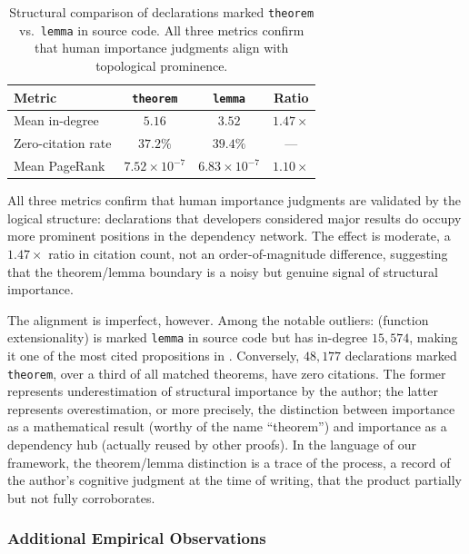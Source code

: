 \begin{table}[ht]
\centering
\begin{tabular}{lccc}
\toprule
Metric & \texttt{theorem} & \texttt{lemma} & Ratio \\
\midrule
Mean in-degree        & $5.16$ & $3.52$ & $1.47\times$ \\
Zero-citation rate    & $37.2\%$ & $39.4\%$ & --- \\
Mean PageRank         & $7.52 \times 10^{-7}$ & $6.83 \times 10^{-7}$ & $1.10\times$ \\
\bottomrule
\end{tabular}
\caption{Structural comparison of declarations marked \texttt{theorem} vs.\ \texttt{lemma} in source code. All three metrics confirm that human importance judgments align with topological prominence.}
\label{tab:thm-vs-lemma}
\end{table}

All three metrics confirm that human importance judgments are validated by the logical structure: declarations that developers considered major results do occupy more prominent positions in the dependency network. The effect is moderate, a $1.47\times$ ratio in citation count, not an order-of-magnitude difference, suggesting that the theorem/lemma boundary is a noisy but genuine signal of structural importance.

\label{rem:misjudged}
The alignment is imperfect, however. Among the notable outliers:  (function extensionality) is marked \texttt{lemma} in source code but has in-degree $15{,}574$, making it one of the most cited propositions in . Conversely, $48{,}177$ declarations marked \texttt{theorem}, over a third of all matched theorems, have zero citations. The former represents underestimation of structural importance by the author; the latter represents overestimation, or more precisely, the distinction between importance as a mathematical result (worthy of the name ``theorem'') and importance as a dependency hub (actually reused by other proofs). In the language of our framework, the theorem/lemma distinction is a trace of the process, a record of the author's cognitive judgment at the time of writing, that the product partially but not fully corroborates.

\subsubsection{Additional Empirical Observations}
\label{sec:additional-empirical}

